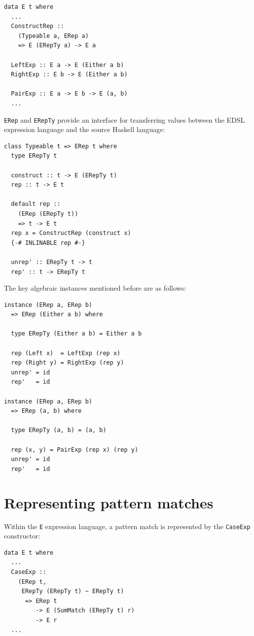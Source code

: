 \documentclass[runningheads, a4paper]{llncs}
\newcommand{\ttt}{\texttt}
\begin{document}
\begin{lstlisting}
data E t where
  ...
  ConstructRep ::
    (Typeable a, ERep a)
    => E (ERepTy a) -> E a

  LeftExp :: E a -> E (Either a b)
  RightExp :: E b -> E (Either a b)

  PairExp :: E a -> E b -> E (a, b)
  ...
\end{lstlisting}

\ttt{ERep} and \ttt{ERepTy} provide an interface for transferring values between the EDSL
expression language and the source Haskell language:

\begin{lstlisting}
class Typeable t => ERep t where
  type ERepTy t

  construct :: t -> E (ERepTy t)
  rep :: t -> E t

  default rep ::
    (ERep (ERepTy t))
    => t -> E t
  rep x = ConstructRep (construct x)
  {-# INLINABLE rep #-}

  unrep' :: ERepTy t -> t
  rep' :: t -> ERepTy t
\end{lstlisting}

The key algebraic instances mentioned before are as follows:

\begin{lstlisting}
instance (ERep a, ERep b)
  => ERep (Either a b) where

  type ERepTy (Either a b) = Either a b

  rep (Left x)  = LeftExp (rep x)
  rep (Right y) = RightExp (rep y)
  unrep' = id
  rep'   = id

instance (ERep a, ERep b)
  => ERep (a, b) where

  type ERepTy (a, b) = (a, b)

  rep (x, y) = PairExp (rep x) (rep y)
  unrep' = id
  rep'   = id
\end{lstlisting}


\section{Representing pattern matches}
\label{sec:PatRep}

Within the \ttt{E} expression language, a pattern match is represented by the
\ttt{CaseExp} constructor:

\begin{lstlisting}
data E t where
  ...
  CaseExp ::
    (ERep t,
     ERepTy (ERepTy t) ~ ERepTy t)
      => ERep t
         -> E (SumMatch (ERepTy t) r)
         -> E r
  ...
\end{lstlisting}
\end{document}
